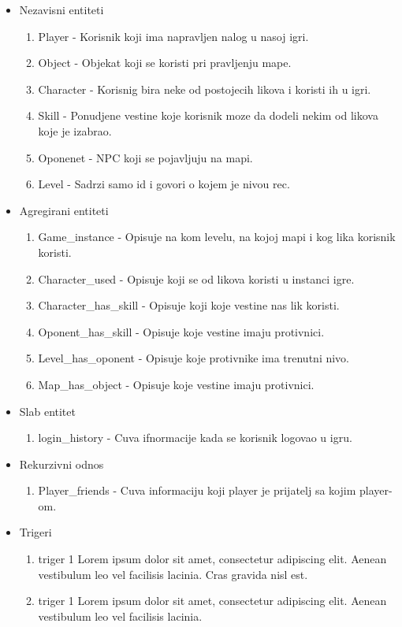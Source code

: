 \documentclass{article}
\begin{document}
\begin{itemize}
\item Nezavisni entiteti
	\begin{enumerate}
	\item Player - Korisnik koji ima napravljen nalog u nasoj igri.
	\item Object - Objekat koji se koristi pri pravljenju mape.
	\item Character - Korisnig bira neke od postojecih likova i koristi ih u igri.
	\item Skill - Ponudjene vestine koje korisnik moze da dodeli nekim od likova koje je izabrao.
	\item Oponenet - NPC koji se pojavljuju na mapi.
	\item Level - Sadrzi samo id i govori o kojem je nivou rec.
	\end{enumerate}

\item Agregirani entiteti
	\begin{enumerate}
	\item Game\_instance - Opisuje na kom levelu, na kojoj mapi i kog lika korisnik koristi.
	\item Character\_used - Opisuje koji se od likova koristi u instanci igre.
	\item Character\_has\_skill - Opisuje koji koje vestine nas lik koristi.
	\item Oponent\_has\_skill - Opisuje koje vestine imaju protivnici.
	\item Level\_has\_oponent - Opisuje koje protivnike ima trenutni nivo.
	\item Map\_has\_object - Opisuje koje vestine imaju protivnici.

	\end{enumerate}

\item Slab entitet
	\begin{enumerate}
	\item login\_history - Cuva ifnormacije kada se korisnik logovao u igru.
	\end{enumerate}

\item Rekurzivni odnos
	\begin{enumerate}
	\item Player\_friends - Cuva informaciju koji player je prijatelj sa kojim player-om.
	\end{enumerate}

\item Trigeri
	\begin{enumerate}
	\item triger 1 \newline
		Lorem ipsum dolor sit amet, consectetur adipiscing elit. Aenean vestibulum leo vel facilisis lacinia. Cras gravida nisl est. \newline
	
	\item triger 1 \newline
		Lorem ipsum dolor sit amet, consectetur adipiscing elit. Aenean vestibulum leo vel facilisis lacinia. 

	\end{enumerate}

\end{itemize}
\end{document}
